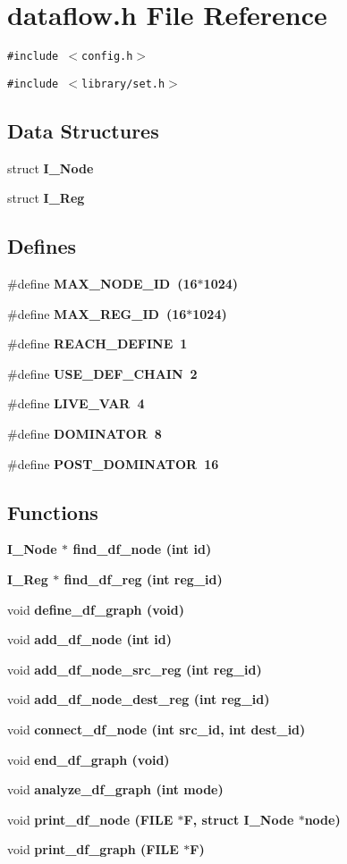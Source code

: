 \section{dataflow.h File Reference}
\label{dataflow_8h}
{\tt \#include $<$config.h$>$}\par
{\tt \#include $<$library/set.h$>$}\par
\subsection*{Data Structures}
\begin{CompactItemize}
\item 
struct \bf{I\_\-Node}
\item 
struct \bf{I\_\-Reg}
\end{CompactItemize}
\subsection*{Defines}
\begin{CompactItemize}
\item 
\#define \bf{MAX\_\-NODE\_\-ID}~(16$\ast$1024)
\item 
\#define \bf{MAX\_\-REG\_\-ID}~(16$\ast$1024)
\item 
\#define \bf{REACH\_\-DEFINE}~1
\item 
\#define \bf{USE\_\-DEF\_\-CHAIN}~2
\item 
\#define \bf{LIVE\_\-VAR}~4
\item 
\#define \bf{DOMINATOR}~8
\item 
\#define \bf{POST\_\-DOMINATOR}~16
\end{CompactItemize}
\subsection*{Functions}
\begin{CompactItemize}
\item 
\bf{I\_\-Node} $\ast$ \bf{find\_\-df\_\-node} (int id)
\item 
\bf{I\_\-Reg} $\ast$ \bf{find\_\-df\_\-reg} (int reg\_\-id)
\item 
void \bf{define\_\-df\_\-graph} (void)
\item 
void \bf{add\_\-df\_\-node} (int id)
\item 
void \bf{add\_\-df\_\-node\_\-src\_\-reg} (int reg\_\-id)
\item 
void \bf{add\_\-df\_\-node\_\-dest\_\-reg} (int reg\_\-id)
\item 
void \bf{connect\_\-df\_\-node} (int src\_\-id, int dest\_\-id)
\item 
void \bf{end\_\-df\_\-graph} (void)
\item 
void \bf{analyze\_\-df\_\-graph} (int \bf{mode})
\item 
void \bf{print\_\-df\_\-node} (FILE $\ast$\bf{F}, struct \bf{I\_\-Node} $\ast$\bf{node})
\item 
void \bf{print\_\-df\_\-graph} (FILE $\ast$\bf{F})
\end{CompactItemize}


